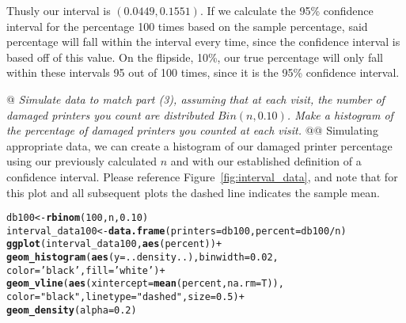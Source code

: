 \documentclass[10pt]{report}\usepackage[]{graphicx}\usepackage[]{xcolor}
\makeatletter
\newcommand{\hlnum}[1]{\textcolor[rgb]{0.686,0.059,0.569}{#1} }%
\newcommand{\hlstr}[1]{\textcolor[rgb]{0.192,0.494,0.8}{#1} }%
\newcommand{\hlopt}[1]{\textcolor[rgb]{0,0,0}{#1} }%
\newcommand{\hlstd}[1]{\textcolor[rgb]{0.345,0.345,0.345}{#1} }%
\newcommand{\hlkwb}[1]{\textcolor[rgb]{0.69,0.353,0.396}{#1} }%
\newcommand{\hlkwc}[1]{\textcolor[rgb]{0.333,0.667,0.333}{#1} }%
\newcommand{\hlkwd}[1]{\textcolor[rgb]{0.737,0.353,0.396}{\textbf{#1} } }%
\newenvironment{kframe}{%
 \def\at@end@of@kframe{}%
 \ifinner\ifhmode%
  \def\at@end@of@kframe{\end{minipage} }%
  \begin{minipage}{\columnwidth}%
 \fi\fi%
 \def\FrameCommand##1{\hskip\@totalleftmargin \hskip-\fboxsep
 \colorbox{shadecolor}{##1}\hskip-\fboxsep
     \hskip-\linewidth \hskip-\@totalleftmargin \hskip\columnwidth}%
 \MakeFramed {\advance\hsize-\width
   \@totalleftmargin\z@ \linewidth\hsize
   \@setminipage} }%
 {\par\unskip\endMakeFramed%
 \at@end@of@kframe}
\newenvironment{knitrout}{}{} %
\makeatother
\begin{document}
\begin{easylist}[enumerate]
        Thusly our interval is $\boxed{\left( 0.0449, 0.1551 \right)}$. If we calculate the 95\%
        confidence interval for the percentage 100 times based on the sample percentage, said percentage will fall
        within the interval every time, since the confidence interval is based off of this value. On the flipside, 10\%,
        our true percentage will only fall within these intervals 95 out of 100 times, since it is the 95\% confidence
        interval.

        \newpage
        @ \textit{Simulate data to match part (3), assuming that at each visit, the number of damaged printers you count
        are distributed $Bin(n, 0.10)$. Make a histogram of the percentage of damaged printers you counted at each
        visit.}
        @@ Simulating appropriate data, we can create a histogram of our damaged printer percentage using our previously
        calculated $n$ and with our established definition of a confidence interval. Please reference
        Figure~\ref{fig:interval_data}, and note that for this plot and all subsequent plots the dashed line indicates
        the sample mean.

\begin{knitrout}
\color{fgcolor}\begin{kframe}
\begin{alltt}
         \hlstd{db100} \hlkwb{<-} \hlkwd{rbinom}\hlstd{(}\hlnum{100}\hlstd{, n,} \hlnum{0.10}\hlstd{)}
         \hlstd{interval_data100} \hlkwb{<-} \hlkwd{data.frame}\hlstd{(}\hlkwc{printers}\hlstd{=db100,} \hlkwc{percent}\hlstd{=db100}\hlopt{/}\hlstd{n)}
         \hlkwd{ggplot}\hlstd{(interval_data100,} \hlkwd{aes}\hlstd{(percent))} \hlopt{+}
                    \hlkwd{geom_histogram}\hlstd{(}\hlkwd{aes}\hlstd{(}\hlkwc{y}\hlstd{=..density..),} \hlkwc{binwidth}\hlstd{=}\hlnum{0.02}\hlstd{,}
                                   \hlkwc{color}\hlstd{=}\hlstr{'black'}\hlstd{,} \hlkwc{fill}\hlstd{=}\hlstr{'white'}\hlstd{)} \hlopt{+}
                    \hlkwd{geom_vline}\hlstd{(}\hlkwd{aes}\hlstd{(}\hlkwc{xintercept}\hlstd{=}\hlkwd{mean}\hlstd{(percent,} \hlkwc{na.rm}\hlstd{=T)),}
                               \hlkwc{color}\hlstd{=}\hlstr{"black"}\hlstd{,} \hlkwc{linetype}\hlstd{=}\hlstr{"dashed"}\hlstd{,} \hlkwc{size}\hlstd{=}\hlnum{0.5}\hlstd{)} \hlopt{+}
                    \hlkwd{geom_density}\hlstd{(}\hlkwc{alpha}\hlstd{=}\hlnum{0.2}\hlstd{)}
\end{alltt}
\end{kframe}\begin{figure}[H]



\end{figure}
\end{knitrout}
\end{easylist}
\end{document}
